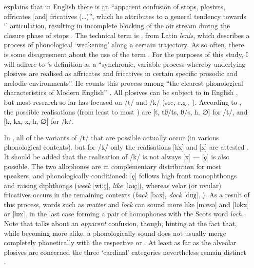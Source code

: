 \textcite[251]{knowles1973} explains that in  English there is an ``apparent confusion of stops, plosives, affricates [and] fricatives (\ldots)'', which he attributes to a general  tendency towards `' articulation, resulting in incomplete blocking of the air stream during the closure phase of stops \parencite[cf.][107]{knowles1973}.
The technical term is , from Latin \emph{lenis}, which describes a process of phonological `weakening' along a certain trajectory.
As so often, there is some disagreement about the use of the term \parencite[cf.][196]{watson2002}. For the purposes of this study, I will adhere to \citeauthor{honeybone2007}'s definition as a ``synchronic, variable process whereby underlying plosives are realised as affricates and fricatives in certain specific prosodic and melodic environments''.
He counts this process among ``the clearest phonological characteristics of Modern  English'' \citeyearpar[129]{honeybone2007}.
All plosives can be subject to  in  English \citep[cf.][236]{honeybone2001}, but most research so far has focused on /t/ and /k/ (see, e.g., \citealt{honeybone2001, sangster2001, watson2002, watson2006}).
According to \textcite[236]{honeybone2001}, the possible realisations (from least  to most ) are [t, tθ/ts, θ/s, h, ∅] for /t/, and [k, kx, x, h, ∅] for /k/.

In , all of the  variants of /t/ that are possible actually occur (in various phonological contexts), but for /k/ only the realisations [kx] and [x] are attested \parencite[cf][242]{honeybone2001}.
It should be added that the  realisation of /k/ is not always [x] --- [ç] is also possible.
The two allophones are in complementary distribution for most speakers, and phonologically conditioned: [ç] follows high front monophthongs and raising diphthongs (\emph{week} [wiːç], \emph{like} [laɪç]), whereas velar (or uvular) fricatives occurs in the remaining contexts (\emph{back} [bax], \emph{dock} [dɒχ], \citealp[cf.][353]{watson2007}).
As a result of this process, words such as \emph{matter} and \emph{lock} can sound more like [mæsə] and [lɒkx] or [lɒx], in the last case forming a pair of homophones with the Scots word \emph{loch} \citep[cf.][73]{trudgill1999}.
Note that \cite{knowles1973} talks about an \emph{apparent} confusion, though, hinting at the fact that, while becoming more alike, a phonologically  sound does not usually merge completely phonetically with the respective  or .
At least as far as the alveolar plosives are concerned the three `cardinal' categories nevertheless remain distinct \parencite[cf.][327 and 252--253]{knowles1973}.

